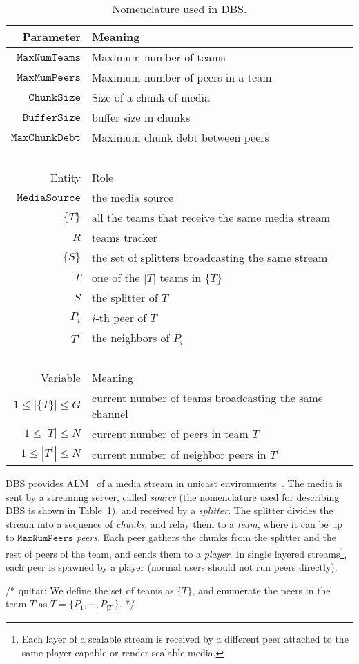 \label{sec:DBS}

\begin{table}
  \begin{tabular}{rl}
    Parameter & Meaning \\
    \hline
    $\mathtt{MaxNumTeams}$  & Maximum number of teams \\
    $\mathtt{MaxMumPeers}$  & Maximum number of peers in a team \\
    $\mathtt{ChunkSize}$    & Size of a chunk of media \\
    $\mathtt{BufferSize}$   & buffer size in chunks \\
    $\mathtt{MaxChunkDebt}$ & Maximum chunk debt between peers \\
    ~\\
    Entity  & Role \\
    \hline
    $\mathtt{MediaSource}$  & the media source \\
    $\{T\}$ & all the teams that receive the same media stream \\
    $R$     & teams tracker \\
    $\{S\}$ & the set of splitters broadcasting the same stream \\
    $T$     & one of the $|T|$ teams in $\{T\}$ \\
    $S$     & the splitter of $T$ \\
    $P_i$   & $i$-th peer of $T$ \\
    $T^i$   & the neighbors of $P_i$ \\
    ~\\
    Variable            & Meaning \\
    \hline
    $1\leq |\{T\}|\leq G$ & current number of teams broadcasting the same channel \\
    $1\leq |T|\leq N$     & current number of peers in team $T$ \\
    $1\leq |T^i|\leq N$   & current number of neighbor peers in $T^i$ \\
  \end{tabular}
  \caption{Nomenclature used in DBS.\label{tab:DBS_nomenclature}}
\end{table}

DBS provides ALM~\cite{banerjee2002scalable} of a media stream in
unicast environments~\cite{comer2003computer}. The media is sent by a
streaming server, called \emph{source} (the nomenclature used for
describing DBS is shown in Table~\ref{tab:DBS_nomenclature}), and
received by a \emph{splitter}. The splitter divides the stream into a
sequence of \emph{chunks}, and relay them to a \emph{team}, where it
can be up to $\mathtt{MaxNumPeers}$ \emph{peers}. Each peer gathers
the chunks from the splitter and the rest of peers of the team, and
sends them to a \emph{player}. In single layered streams\footnote{Each
layer of a scalable stream is received by a different peer attached to
the same player capable or render scalable media.}, each peer is
spawned by a player (normal users should not run peers directly).

/* quitar: We define the set of teams as
$\{T\}$,
and enumerate the peers in the team $T$ as $T=\{P_1,\cdots,P_{|T|}\}$. */
